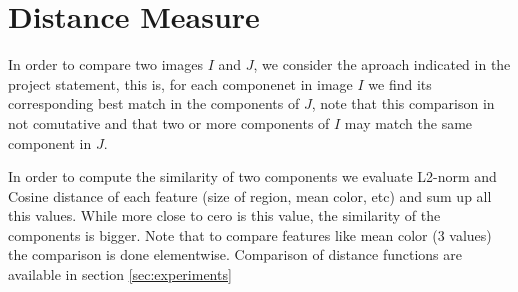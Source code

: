 \section{Distance Measure}
In order to compare two images $I$ and $J$, we consider the aproach indicated in the project statement, this is, for each componenet in image $I$ we find its corresponding best match in the components of $J$, note that this comparison in not comutative and that two or more components of $I$ may match the same component in $J$. 

In order to compute the similarity of two components we evaluate L2-norm and Cosine distance of each feature (size of region, mean color, etc) and sum up all this values. While more close to cero is this value, the similarity of the components is bigger. Note that to compare features like mean color (3 values) the comparison is done elementwise. Comparison of distance functions are available in section \ref{sec:experiments}


